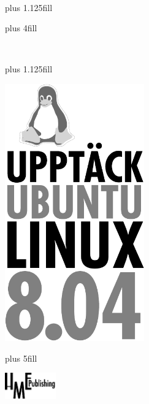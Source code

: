 \documentclass[a4paper,final]{memoir} %
\title{\xfullname{}}
\author{Tobias Hagberg}
\date{} %
\begin{document}
\renewcommand{\figurename}{Bild} %

\frontmatter

\def\tocmark{\markboth{Innehåll}{Innehåll}}
\def\indexmark{\markboth{\indexname}{\indexname}}


\pagestyle{xempty}

\begin{center}

\selectfont

~

\vskip 0pt plus 1.125fill

\noindent\textbf{\thetitle}

\vskip 0pt plus 4fill

\end{center}

\newpage

\vbox{\vskip 1cm}

\newpage

\begin{center}

\selectfont

~

\vskip 0pt plus 1.125fill

\begin{centering}
\noindent\includegraphics[width=60mm]{bilder804-all/titel}
\end{centering}

\baselineskip

\noindent\secheadstyle{\theauthor}

\vskip 0pt plus 5fill

\noindent\includegraphics[width=22mm]{bilder804-all/logo_final_bw}

\end{center}
\end{document}
